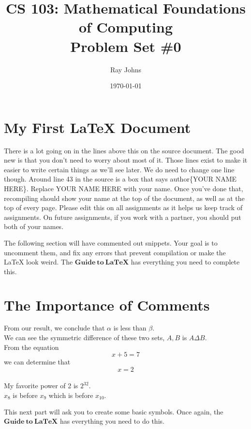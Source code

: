 \documentclass{article}
\title{CS 103: Mathematical Foundations of Computing\\Problem Set \#0}
\author{Ray Johns}
\date{\today}
\renewcommand{\(}{\left(}
\renewcommand{\)}{\right)}
\theoremstyle{plain}
\theoremstyle{plain}
\theoremstyle{definition}
\begin{document}
\maketitle

\section{My First LaTeX Document}
\begin{shaded}
  There is a lot going on in the lines above this on the source document. The good new is that you don't need to worry about most of it. Those lines exist to make it easier to write certain things as we'll see later. We do need to change one line though. Around line 43 in the source is a box that says author\{YOUR NAME HERE\}. Replace YOUR NAME HERE with your name. Once you've done that, recompiling should show your name at the top of the document, as well as at the top of every page. Please edit this on all assignments as it helps us keep track of assignments. On future assignments, if you work with a partner, you should put both of your names.
\end{shaded}

The following section will have commented out snippets. Your goal is to uncomment them, and fix any errors that prevent compilation or make the LaTeX look weird.  The $\mathbf{Guide\ to\ LaTeX}$ has everything you need to complete this.\\

\section{The Importance of Comments}
From our result, we conclude that $\alpha$ is less than $\beta$.\\

We can see the symmetric difference of these two sets, $A, B$ is $A \Delta B$.\\

From the equation \[x+5=7\] we can determine that \[x=2\]\\

My favorite power of 2 is $2^{32}.$ \\

$x_8$ is before $x_9$ which is before $x_{10}$. \\

\newpage

This next part will ask you to create some basic symbols. Once again, the $\mathbf{Guide\ to\ LaTeX}$ has everything you need to do this.
\end{document}
